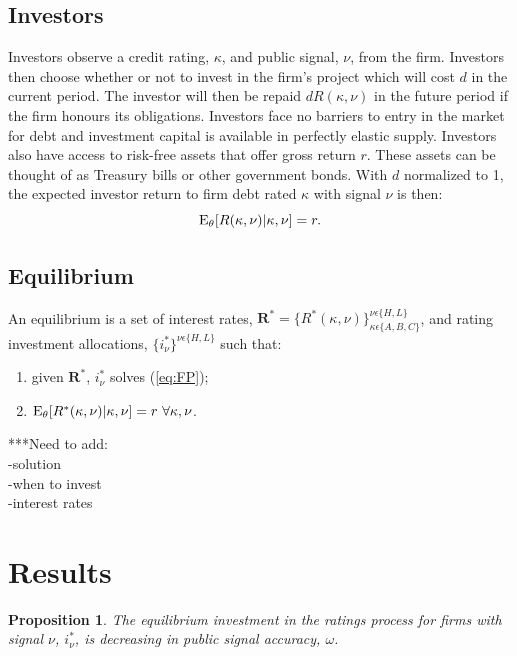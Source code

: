 \documentclass[titlepage]{article}
\newtheorem{proposition}{Proposition}
\begin{document}
\subsection{Investors}

Investors observe a credit rating, $\kappa$, and public signal, $\nu$, from the firm. Investors then choose whether or not to invest in the firm's project which will cost $d$ in the current period. The investor will then be repaid $dR(\kappa,\nu)$ in the future period if the firm honours its obligations. Investors face no barriers to entry in the market for debt and investment capital is available in perfectly elastic supply. Investors also have access to risk-free assets that offer gross return $r$. These assets can be thought of as Treasury bills or other government bonds. With $d$ normalized to 1, the expected investor return to firm debt rated $\kappa$ with signal $\nu$ is then:
\begin{equation}
\label{eq:IP} \textup{E}_{\theta} [R(\kappa,\nu)|\kappa,\nu ]=r.
\end{equation}


\subsection{Equilibrium}

An equilibrium is a set of interest rates, $\mathbf{R}^{*}=\{ R^{*}(\kappa,\nu)\}_{\kappa\epsilon\{A,B,C\}}^{\nu\epsilon\{H,L\}}$, and rating investment allocations, $\{i^{*}_{\nu}\}^{\nu\epsilon\{H,L\}}$ such that:
\begin{enumerate}
	\item given $\mathbf{R}^{*}$, $i^{*}_{\nu}$ solves (\ref{eq:FP});
	\item $\textup{E}_{\theta} [R^{*}(\kappa,\nu)|\kappa,\nu ] = r \,\, \forall \kappa, \nu$.
\end{enumerate}

***Need to add:\\
-solution\\
-when to invest\\
-interest rates

\section{Results}
\label{sec:res}%
\begin{proposition}
\label{pr:pi}
The equilibrium investment in the ratings process for firms with signal $\nu$, $i^{*}_{\nu}$, is decreasing in public signal accuracy, $\omega$.
\end{proposition}
\end{document}
